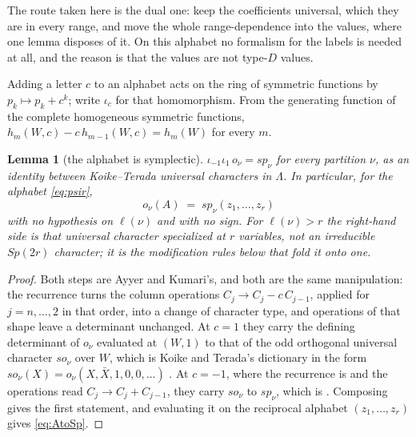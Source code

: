 \documentclass[11pt,reqno]{amsart}
\theoremstyle{plain}
\newtheorem{lemma}[theorem]{Lemma}
\theoremstyle{definition}
\begin{document}
The route taken here is the dual
one: keep the coefficients universal, which they are in every range, and move the whole
range-dependence into the values, where one lemma disposes of it. On this alphabet no formalism for
the labels is needed at all, and the reason is that the values are not type-$D$ values.

Adding a letter $c$ to an alphabet acts on the ring of symmetric functions by $p_k\mapsto p_k+c^k$;
write $\iota_c$ for that homomorphism. From the generating function of the complete homogeneous
symmetric functions, $h_m(W,c)-c\,h_{m-1}(W,c)=h_m(W)$ for every $m$.

\begin{lemma}[the alphabet is symplectic]\label{lem:AtoSp}
$\iota_{-1}\iota_{1}\,o_\nu=sp_\nu$ for every partition $\nu$, as an identity between Koike--Terada
\emph{universal} characters in $\Lambda$. In particular, for the alphabet
\eqref{eq:psir},
\begin{equation}\label{eq:AtoSp}
o_\nu(A)\;=\;sp_\nu(z_1,\dots,z_r)
\end{equation}
with no hypothesis on $\ell(\nu)$ and with no sign. For $\ell(\nu)>r$ the right-hand side is
that universal character specialized at $r$ variables, not an irreducible $Sp(2r)$ character; it is
the modification rules below that fold it onto one.
\end{lemma}

\begin{proof}
Both steps are Ayyer and Kumari's, and both are the same manipulation: the recurrence turns the
column operations $C_j\to C_j-c\,C_{j-1}$, applied for $j=n,\dots,2$ in that order, into a change of
character type, and operations of that shape leave a determinant unchanged. At $c=1$ they carry the
defining determinant of $o_\nu$ evaluated at $(W,1)$ to that of the odd orthogonal universal
character $so_\nu$ over $W$, which is Koike and Terada's dictionary in the form
$so_\nu(X)=o_\nu(X,\bar X,1,0,0,\dots)$ \cite[(2.13)]{AK25}. At $c=-1$, where the recurrence is
\cite[Proposition 2.1]{AK25} and the operations read $C_j\to C_j+C_{j-1}$, they carry $so_\nu$ to
$sp_\nu$, which is \cite[Lemma 3.2]{AK25}. Composing gives the first statement, and evaluating it on
the reciprocal alphabet $(z_1,\dots,z_r)$ gives \eqref{eq:AtoSp}.
\end{proof}
\end{document}
